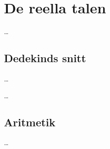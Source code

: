 \chapter{De reella talen}
\label{ch:Reella}%
\dots

\section{Dedekinds snitt}
\dots

\begin{definition}[Snitt]
  \dots
\end{definition}


\section{Aritmetik}
\dots

